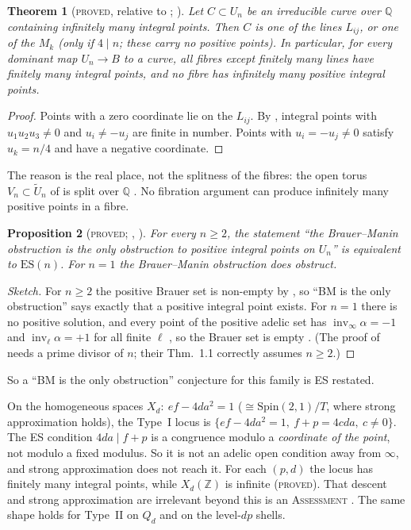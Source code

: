 \documentclass[10pt,reqno]{amsart}
\newtheorem{theorem}{Theorem}[section]
\newtheorem{proposition}[theorem]{Proposition}
\theoremstyle{definition}
\numberwithin{equation}{section}
\newcommand{\Z}{\mathbb Z}
\newcommand{\Q}{\mathbb Q}
\newcommand{\status}[1]{\textup{\textsc{#1}}}
\begin{document}
\begin{theorem}[\status{proved}, relative to {\cite[Lemma~3.10]{BL}}; {\cite[Thm.~3.1]{O126}}]\label{thm:fibres}
Let $C\subset U_n$ be an irreducible curve over $\Q$ containing infinitely
many integral points. Then $C$ is one of the lines $L_{ij}$, or one of the
$M_k$ (only if $4\mid n$; these carry no positive points). In particular,
for every dominant map $U_n\to B$ to a curve, all fibres except finitely
many lines have finitely many integral points, and no fibre has infinitely
many positive integral points.
\end{theorem}
\begin{proof}
Points with a zero coordinate lie on the $L_{ij}$. By \cite[Lemma~3.10]{BL},
integral points with $u_1u_2u_3\ne0$ and $u_i\ne-u_j$ are finite in number.
Points with $u_i=-u_j\ne0$ satisfy $u_k=n/4$ and have a negative coordinate.
\end{proof}
The reason is the real place, not the splitness of the fibres: the open
torus $V_n\subset\tilde U_n$ of \cite[Lemma~2.1]{BL} is split over $\Q$
\cite[Prop.~3.2]{O126}.
No fibration argument can produce infinitely many positive points in a
fibre.

\begin{proposition}[\status{proved}; {\cite[\S1]{O126}}, {\cite{BL}}]\label{prop:BMonly}
For every $n\ge2$, the statement ``the Brauer--Manin obstruction is the
only obstruction to positive integral points on $U_n$'' is equivalent to
$\mathrm{ES}(n)$. For $n=1$ the Brauer--Manin obstruction does obstruct.
\end{proposition}
\begin{proof}[Sketch]
For $n\ge2$ the positive Brauer set is non-empty by \cite[Thm.~1.8]{BL}, so
``BM is the only obstruction'' says exactly that a positive integral point
exists. For $n=1$ there is no positive solution, and every point of the positive
adelic set has $\operatorname{inv}_\infty\alpha=-1$ and $\operatorname{inv}_\ell\alpha=+1$ for all
finite $\ell$ \cite[Lemmas~3.1, 3.5, 3.8]{BL}, so the Brauer set is empty
\cite[\S1]{O126}. (The proof of \cite[Thm.~1.8]{BL} needs a prime divisor
of $n$; their Thm.~1.1 correctly assumes $n\ge2$.)
\end{proof}
So a ``BM is the only obstruction'' conjecture for this family is ES
restated.

On the homogeneous spaces $X_d:\ ef-4da^2=1$ ($\cong\mathrm{Spin}(2,1)/T$,
where strong approximation holds), the Type~I locus is
$\{ef-4da^2=1,\ f+p=4cda,\ c\ne0\}$. The ES condition $4da\mid f+p$ is a
congruence modulo a \emph{coordinate of the point}, not modulo a fixed
modulus. So it is not an adelic open condition away from $\infty$, and
strong approximation does not reach it. For each $(p,d)$ the locus has
finitely many integral points, while $X_d(\Z)$ is infinite
\cite[Prop.~4.1]{O126} (\status{proved}). That descent and strong
approximation are irrelevant beyond this is an \status{Assessment}
\cite[Cor.~4.2]{O126}. The same shape holds for Type~II on $Q_d$ and on the
level-$dp$ shells.
\end{document}
